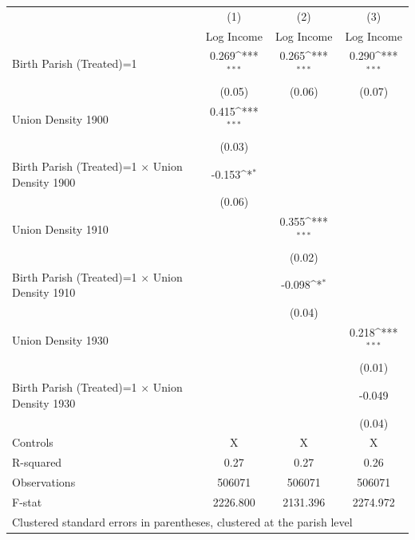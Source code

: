 {
\def\sym#1{\ifmmode^{#1}\else\(^{#1}\)\fi}
\begin{tabular}{l*{3}{c}}
\hline\hline
                    &\multicolumn{1}{c}{(1)}&\multicolumn{1}{c}{(2)}&\multicolumn{1}{c}{(3)}\\
                    &\multicolumn{1}{c}{Log Income}&\multicolumn{1}{c}{Log Income}&\multicolumn{1}{c}{Log Income}\\
\hline
Birth Parish (Treated)=1&       0.269\sym{***}&       0.265\sym{***}&       0.290\sym{***}\\
                    &      (0.05)         &      (0.06)         &      (0.07)         \\
Union Density 1900&       0.415\sym{***}&                     &                     \\
                    &      (0.03)         &                     &                     \\
Birth Parish (Treated)=1 $\times$ Union Density 1900&      -0.153\sym{*}  &                     &                     \\
                    &      (0.06)         &                     &                     \\
Union Density 1910&                     &       0.355\sym{***}&                     \\
                    &                     &      (0.02)         &                     \\
Birth Parish (Treated)=1 $\times$ Union Density 1910&                     &      -0.098\sym{*}  &                     \\
                    &                     &      (0.04)         &                     \\
Union Density 1930&                     &                     &       0.218\sym{***}\\
                    &                     &                     &      (0.01)         \\
Birth Parish (Treated)=1 $\times$ Union Density 1930&                     &                     &      -0.049         \\
                    &                     &                     &      (0.04)         \\

\hline
Controls & X  & X & X \\
\hline
R-squared           &        0.27         &        0.27         &        0.26         \\
Observations        &      506071         &      506071         &      506071         \\
F-stat              &    2226.800         &    2131.396         &    2274.972         \\
\hline\hline
\multicolumn{4}{l}{\footnotesize Clustered standard errors in parentheses, clustered at the parish level}\\
\end{tabular}
}
